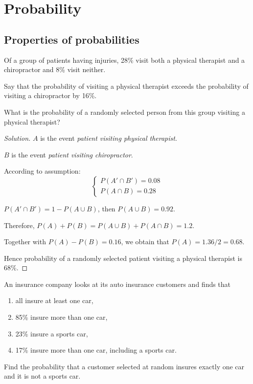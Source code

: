 \documentclass[class=probandstats,crop=false]{standalone}
\begin{document}
\chapter{Probability}

\section{Properties of probabilities}

\begin{exercise}
    \par Of a group of patients having injuries, 28\% visit both a physical therapist and a chiropractor and 8\% visit neither.
    \par Say that the probability of visiting a physical therapist exceeds the probability of visiting a chiropractor by 16\%.
    \par What is the probability of a randomly selected person from this group visiting a physical therapist?
\end{exercise}

\begin{proof}[Solution]
    \par $A$ is the event \textit{patient visiting physical therapist}.
    \par $B$ is the event \textit{patient visiting chiropractor}.
    \bigskip
    \par According to assumption:
    \[
        \begin{cases}
            P(A'\cap B') = 0.08 \\
            P(A\cap B) = 0.28
        \end{cases}
    \]
    \par $P(A'\cap B') = 1 - P(A\cup B)$, then $P(A\cup B) = 0.92$.
    \par Therefore, $P(A) + P(B) = P(A\cup B) + P(A\cap B) = 1.2$.
    \par Together with $P(A) - P(B) = 0.16$, we obtain that $P(A) = 1.36 / 2 = 0.68$.
    \par Hence probability of a randomly selected patient visiting a physical therapist is 68\%.
\end{proof}

\begin{exercise}
    \par An insurance company looks at its auto insurance customers and finds that
    \begin{enumerate}[label = (\alph*)]
        \item all insure at least one car,
        \item 85\% insure more than one car,
        \item 23\% insure a sports car,
        \item 17\% insure more than one car, including a sports car.
    \end{enumerate}
    \par Find the probability that a customer selected at random insures exactly one car and it is not a sports car.
\end{exercise}
\end{document}
